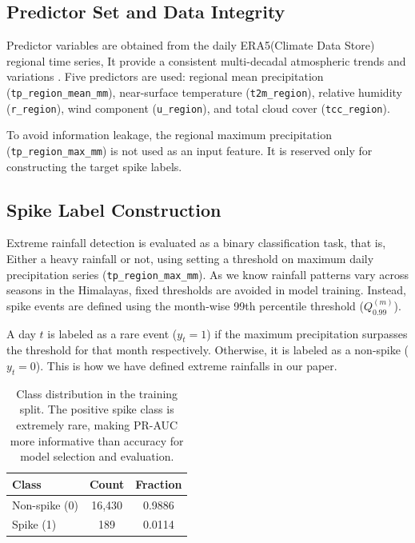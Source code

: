\documentclass[runningheads]{llncs}
\begin{document}
\subsection{Predictor Set and Data Integrity}
Predictor variables are obtained from the daily ERA5(Climate Data Store) regional time series, It provide a consistent multi-decadal atmospheric trends and variations \cite{era5}. Five predictors are used: regional mean precipitation (\texttt{tp\_region\_mean\_mm}), near-surface temperature (\texttt{t2m\_region}), relative humidity (\texttt{r\_region}), wind component (\texttt{u\_region}), and total cloud cover (\texttt{tcc\_region}).

To avoid information leakage, the regional maximum precipitation (\texttt{tp\_region\_max\_mm}) is not used as an input feature. It is reserved only for constructing the target spike labels.

\subsection{Spike Label Construction}
Extreme rainfall detection is evaluated as a binary classification task, that is, Either a heavy rainfall or not, using setting a threshold on maximum daily precipitation series (\texttt{tp\_region\_max\_mm}). As we know rainfall patterns vary across seasons in the Himalayas, fixed thresholds are avoided in model training. Instead, spike events are defined using the month-wise 99th percentile threshold ($Q_{0.99}^{(m)}$).

A day $t$ is labeled as a rare event ($y_t=1$) if the maximum precipitation surpasses the threshold for that month respectively. Otherwise, it is labeled as a non-spike ($y_t=0$). This is how we have defined extreme rainfalls in our paper.

\begin{table}[t]
\caption{Class distribution in the training split. The positive spike class is extremely rare, making PR-AUC more informative than accuracy for model selection and evaluation.}
\label{tab:class_distribution_train}
\centering
\footnotesize
\setlength{\tabcolsep}{8pt}
\begin{tabular}{lcc}
\toprule
\textbf{Class} & \textbf{Count} & \textbf{Fraction} \\
\midrule
Non-spike (0) & 16,430 & 0.9886 \\
Spike (1)     & 189    & 0.0114 \\
\bottomrule
\end{tabular}
\end{table}
\end{document}
